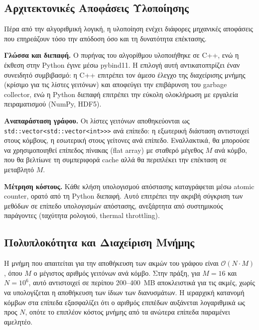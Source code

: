 \documentclass[12pt,a4paper]{article}
\begin{document}
\subsection{Αρχιτεκτονικές Αποφάσεις Υλοποίησης}

Πέρα από την αλγοριθμική λογική, η υλοποίηση ενέχει διάφορες μηχανικές αποφάσεις που επηρεάζουν τόσο την απόδοση όσο και τη δυνατότητα επέκτασης.

\textbf{Γλώσσα και διεπαφή.} Ο πυρήνας του αλγορίθμου υλοποιήθηκε σε C++, ενώ η έκθεση στην Python έγινε μέσω pybind11. Η επιλογή αυτή αντικατοπτρίζει έναν συνειδητό συμβιβασμό: η C++ επιτρέπει τον άμεσο έλεγχο της διαχείρισης μνήμης (κρίσιμο για τις λίστες γειτόνων) και αποφεύγει την επιβάρυνση του garbage collector, ενώ η Python διεπαφή επιτρέπει την εύκολη ολοκλήρωση με εργαλεία πειραματισμού (NumPy, HDF5).

\textbf{Αναπαράσταση γράφου.} Οι λίστες γειτόνων αποθηκεύονται ως \texttt{std::vector<std::vector<int>>\textgreater} ανά επίπεδο: η εξωτερική διάσταση αντιστοιχεί στους κόμβους, η εσωτερική στους γείτονες ανά επίπεδο. Εναλλακτικά, θα μπορούσε να χρησιμοποιηθεί επίπεδος πίνακας (flat array) με σταθερό μέγεθος $M$ ανά κόμβο, που θα βελτίωνε τη συμπεριφορά cache αλλά θα περιπλέκει την επέκταση σε μεταβλητό $M$.

\textbf{Μέτρηση κόστους.} Κάθε κλήση υπολογισμού απόστασης καταγράφεται μέσω atomic counter, ορατό από τη Python διεπαφή. Αυτό επιτρέπει την ακριβή σύγκριση των μεθόδων σε επίπεδο υπολογισμών απόστασης, ανεξάρτητα από συστημικούς παράγοντες (ταχύτητα ρολογιού, thermal throttling).

\subsection{Πολυπλοκότητα και Διαχείριση Μνήμης}

Η μνήμη που απαιτείται για την αποθήκευση των ακμών του γράφου είναι $\mathcal{O}(N \cdot M)$, όπου $M$ ο μέγιστος αριθμός γειτόνων ανά κόμβο. Στην πράξη, για $M=16$ και $N=10^6$, αυτό αντιστοιχεί σε περίπου 200--400~MB αποκλειστικά για τις ακμές, χωρίς να υπολογίζεται η αποθήκευση των ίδιων των διανυσμάτων. Η ιεραρχική κατανομή κόμβων στα επίπεδα εξασφαλίζει ότι ο αριθμός επιπέδων αυξάνεται λογαριθμικά ως προς $N$, οπότε το επιπλέον κόστος μνήμης από τα ανώτερα επίπεδα παραμένει αμελητέο.
\end{document}
